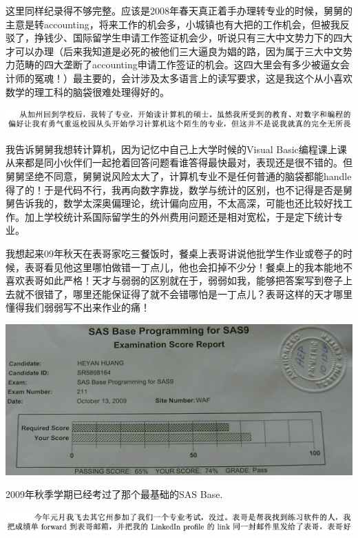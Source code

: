 \documentclass[9pt, b5paper]{article}
\begin{document}
这里同样纪录得不够完整。应该是2008年春天真正着手办理转专业的时候，舅舅的主意是转accounting，将来工作的机会多，小城镇也有大把的工作机会，但被我反驳了，挣钱少、国际留学生申请工作签证机会少，听说只有三大中文势力下的四大才可以办理（后来我知道是必死的被他们三大逼良为娼的路，因为属于三大中文势力范畴的四大垄断了accounting申请工作签证的机会。这四大里会有多少被逼女会计师的冤魂！）最主要的，会计涉及太多语言上的读写要求，这是我这个从小喜欢数学的理工科的脑袋很难处理得好的。

\begin{center}
\includegraphics[width=.9\linewidth]{./pic/backups_plans_20210414_171951.png}
\end{center}

我告诉舅舅我想转计算机，因为记忆中自己上大学时候的Visual Basic编程课上课从来都是同小伙伴们一起抢着回答问题看谁答得最快最对，表现还是很不错的。但舅舅坚绝不同意，舅舅说风险太大了，计算机专业不是任何普通的脑袋都能handle得了的！于是代码不行，我再向数字靠拢，数学与统计的区别，也不记得是否是舅舅告诉我的，数学太深奥偏理论，统计偏向应用，不太高深，可能也还比较好找工作。加上学校统计系国际留学生的外州费用问题还是相对宽松，于是定下统计专业。 

我想起来09年秋天在表哥家吃三餐饭时，餐桌上表哥讲说他批学生作业或卷子的时候，表哥看见他这里哪怕做错一丁点儿，他也会扣掉不少分！餐桌上的我本能地不喜欢表哥如此严格！天才与弱弱的区别就在于，弱弱如我，能够把答案写到卷子上去就不很错了，哪里还能保证得了就不会错哪怕是一丁点儿？表哥这样的天才哪里懂得我们弱弱写不出来作业的痛！

\begin{center}
\includegraphics[width=.9\linewidth]{./pic/backups_plans_20210414_190557.png}
\end{center}

2009年秋季学期已经考过了那个最基础的SAS Base.

\begin{center}
\includegraphics[width=.9\linewidth]{./pic/backups_plans_20210414_164402.png}
\end{center}
\end{document}
